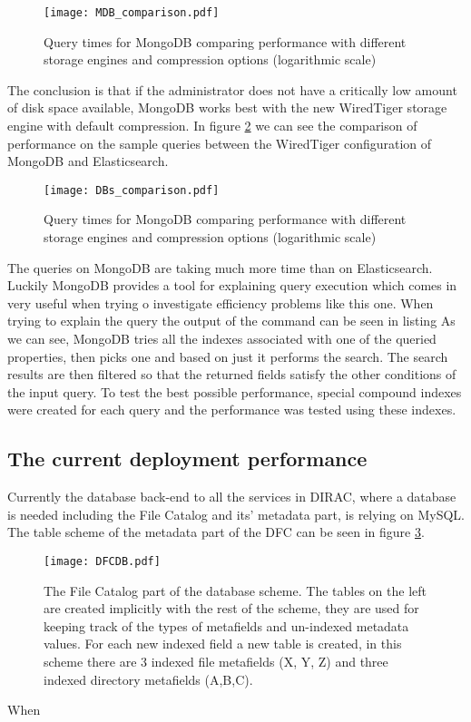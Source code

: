 \begin{figure}[h]
	\centering
	\texttt{[image: MDB\_comparison.pdf]}
	\caption{Query times for MongoDB comparing performance with different storage engines and compression 
	options (logarithmic scale)}
	\label{fig:MDBcomparison}
\end{figure}

The conclusion is that if the administrator does not have a critically low amount of disk space available, MongoDB
works best with the new WiredTiger storage engine with default compression. In figure \ref{fig:DBscomparison} we 
can see the comparison of performance on the sample queries between the WiredTiger configuration of MongoDB and 
Elasticsearch. 

\begin{figure}[h]
	\centering
	\texttt{[image: DBs\_comparison.pdf]}
	\caption{Query times for MongoDB comparing performance with different storage engines and compression 
	options (logarithmic scale)}
	\label{fig:DBscomparison}
\end{figure}

The queries on MongoDB are taking much more time than on Elasticsearch. Luckily MongoDB provides
a tool for explaining query execution which comes in very useful when trying o investigate efficiency problems
like this one. When trying to explain the query %
the output of the command can be seen in listing %
As we can see, MongoDB tries all the indexes associated with one of the queried properties, then picks one and 
based on just it performs the search. The search results are then filtered so that the returned fields satisfy the
other conditions of the input query. To test the best possible performance, special compound indexes were created 
for each query and the performance was tested using these indexes. 


\subsection{The current deployment performance}

Currently the database back-end to all the services in DIRAC, where a database is needed including the File Catalog
and its' metadata part, is relying on MySQL. The table scheme of the metadata part of the DFC can be seen in figure
\ref{fig:DFCUML}.

\begin{figure}[h]
	\centering
	\texttt{[image: DFCDB.pdf]}
	\caption{The File Catalog part of the database scheme. The tables on the left are created implicitly with the
	rest of the scheme, they are used  for keeping track of the types of metafields and un-indexed  metadata 
	values. For each new indexed field a new table is created, in this scheme there are 3 indexed file metafields
	(X, Y, Z) and three indexed directory metafields (A,B,C).}
	\label{fig:DFCUML}
\end{figure}

When